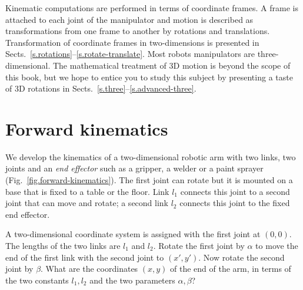 Kinematic computations are performed in terms of coordinate frames. A frame is attached to each joint of the manipulator and motion is described as transformations from one frame to another by rotations and translations. Transformation of coordinate frames in two-dimensions is presented in Sects.~\ref{s.rotations}--\ref{s.rotate-translate}. Most robots manipulators are three-dimensional. The mathematical treatment of 3D motion is beyond the scope of this book, but we hope to entice you to study this subject by presenting a taste of 3D rotations in Sects.~\ref{s.three}--\ref{s.advanced-three}.


\section{Forward kinematics}\label{s.forward-kinematics}

We develop the kinematics of a two-dimensional robotic arm with two links, two joints and an \emph{end effector} such as a gripper, a welder or a paint sprayer (Fig.~\ref{fig.forward-kinematics}). The first joint can rotate but it is mounted on a base that is fixed to a table or the floor. Link $l_1$ connects this joint to a second joint that can move and rotate; a second link $l_2$ connects this joint to the fixed end effector.

A two-dimensional coordinate system is assigned with the first joint at $(0,0)$. The lengths of the two links are $l_1$ and $l_2$. Rotate the first joint by $\alpha$ to move the end of the first link with the second joint to $(x',y')$. Now rotate the second joint by $\beta$. What are the coordinates $(x,y)$ of the end of the arm, in terms of the two constants $l_1,l_2$ and the two parameters $\alpha,\beta$?

